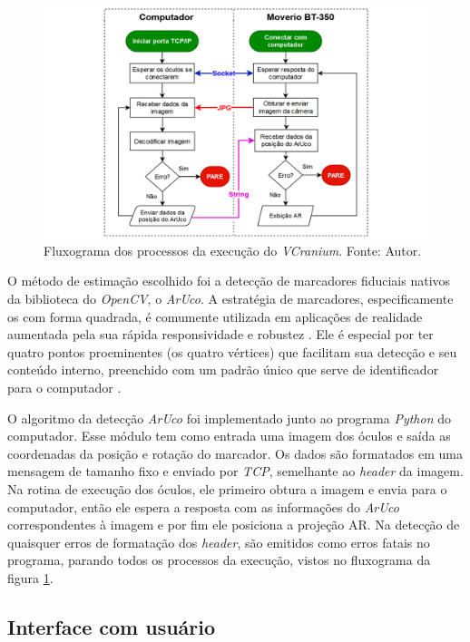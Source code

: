 \begin{figure}[!h]
    \centering
    \includegraphics[width=.9\linewidth]{figuras/flowchart.png}
    \caption{Fluxograma dos processos da execução do \textit{VCranium}. Fonte: Autor.}
    \label{fig:flowchart}
\end{figure}

O método de estimação escolhido foi a detecção de marcadores fiduciais nativos da biblioteca do \textit{OpenCV}, o \textit{ArUco}. A estratégia de marcadores, especificamente os com forma quadrada, é comumente utilizada em aplicações de realidade aumentada pela sua rápida responsividade e robustez \cite{Romero-Ramirez2018}. Ele é especial por ter quatro pontos proeminentes (os quatro vértices) que facilitam sua detecção e seu conteúdo interno, preenchido com um padrão único que serve de identificador para o computador \cite{Poroykov2020}.

O algoritmo da detecção \textit{ArUco} foi implementado junto ao programa \textit{Python} do computador. Esse módulo tem como entrada uma imagem dos óculos e saída as coordenadas da posição e rotação do marcador. Os dados são formatados em uma mensagem de tamanho fixo e enviado por \textit{TCP}, semelhante ao \textit{header} da imagem. Na rotina de execução dos óculos, ele primeiro obtura a imagem e envia para o computador, então ele espera a resposta com as informações do \textit{ArUco} correspondentes à imagem e por fim ele posiciona a projeção AR. Na detecção de quaisquer erros de formatação dos \textit{header}, são emitidos como erros fatais no programa, parando todos os processos da execução, vistos no fluxograma da figura \ref{fig:flowchart}.

\subsection{Interface com usuário}

